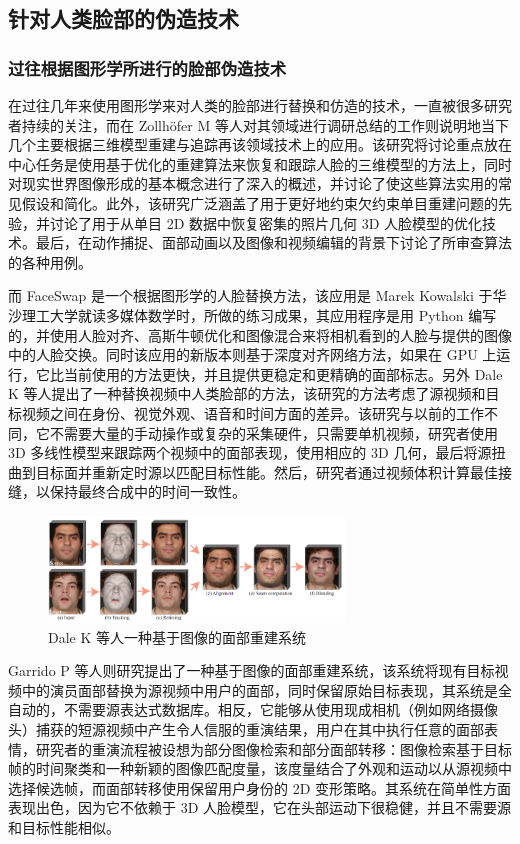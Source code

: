 \subsection{针对人类脸部的伪造技术}

\subsubsection{过往根据图形学所进行的脸部伪造技术}

在过往几年来使用图形学来对人类的脸部进行替换和仿造的技术，一直被很多研究者持续的关注，而在 Zollhöfer M 等人对其领域进行调研总结的工作则说明地当下几个主要根据三维模型重建与追踪再该领域技术上的应用。该研究将讨论重点放在中心任务是使用基于优化的重建算法来恢复和跟踪人脸的三维模型的方法上，同时对现实世界图像形成的基本概念进行了深入的概述，并讨论了使这些算法实用的常见假设和简化。此外，该研究广泛涵盖了用于更好地约束欠约束单目重建问题的先验，并讨论了用于从单目 2D 数据中恢复密集的照片几何 3D 人脸模型的优化技术。最后，在动作捕捉、面部动画以及图像和视频编辑的背景下讨论了所审查算法的各种用例。

而 FaceSwap \cite{list1107} 是一个根据图形学的人脸替换方法，该应用是 Marek Kowalski 于华沙理工大学就读多媒体数学时，所做的练习成果，其应用程序是用 Python 编写的，并使用人脸对齐、高斯牛顿优化和图像混合来将相机看到的人脸与提供的图像中的人脸交换。同时该应用的新版本则基于深度对齐网络方法，如果在 GPU 上运行，它比当前使用的方法更快，并且提供更稳定和更精确的面部标志。另外 Dale K 等人\cite{dale2011video}提出了一种替换视频中人类脸部的方法，该研究的方法考虑了源视频和目标视频之间在身份、视觉外观、语音和时间方面的差异。该研究与以前的工作不同，它不需要大量的手动操作或复杂的采集硬件，只需要单机视频，研究者使用 3D 多线性模型来跟踪两个视频中的面部表现，使用相应的 3D 几何，最后将源扭曲到目标面并重新定时源以匹配目标性能。然后，研究者通过视频体积计算最佳接缝，以保持最终合成中的时间一致性。

\begin{figure}[htb]
\centering 
\includegraphics[width=0.70\textwidth]{img/ch1m3.png} 
\caption{Dale K 等人一种基于图像的面部重建系统}
\label{Test}
\end{figure}

Garrido P \cite{garrido2014automatic} 等人则研究提出了一种基于图像的面部重建系统，该系统将现有目标视频中的演员面部替换为源视频中用户的面部，同时保留原始目标表现，其系统是全自动的，不需要源表达式数据库。相反，它能够从使用现成相机（例如网络摄像头）捕获的短源视频中产生令人信服的重演结果，用户在其中执行任意的面部表情，研究者的重演流程被设想为部分图像检索和部分面部转移：图像检索基于目标帧的时间聚类和一种新颖的图像匹配度量，该度量结合了外观和运动以从源视频中选择候选帧，而面部转移使用保留用户身份的 2D 变形策略。其系统在简单性方面表现出色，因为它不依赖于 3D 人脸模型，它在头部运动下很稳健，并且不需要源和目标性能相似。

